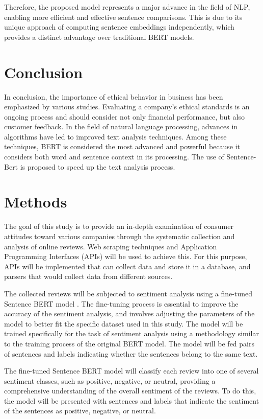 \documentclass[PI]{ProjectProposal}
\begin{document}
Therefore, the proposed model represents a major advance in the field of NLP, enabling more efficient and effective sentence comparisons. This is due to its unique approach of computing sentence embeddings independently, which provides a distinct advantage over traditional BERT models.
\section{Conclusion}
\label{sec:orgdadd73e}
In conclusion, the importance of ethical behavior in business has been emphasized by various studies. Evaluating a company's ethical standards is an ongoing process and should consider not only financial performance, but also customer feedback. In the field of natural language processing, advances in algorithms have led to improved text analysis techniques. Among these techniques, BERT is considered the most advanced and powerful because it considers both word and sentence context in its processing. The use of Sentence-Bert is proposed to speed up the text analysis process.
\section{Methods}
\label{sec:org3da7be6}
The goal of this study is to provide an in-depth examination of consumer attitudes toward various companies through the systematic collection and analysis of online reviews. Web scraping techniques and Application Programming Interfaces (APIs) will be used to achieve this. For this purpose, APIs will be implemented that can collect data and store it in a database, and parsers that would collect data from different sources.

The collected reviews will be subjected to sentiment analysis using a fine-tuned Sentence BERT model \autocite{reimers-2019-sentence-bert}. The fine-tuning process is essential to improve the accuracy of the sentiment analysis, and involves adjusting the parameters of the model to better fit the specific dataset used in this study. The model will be trained specifically for the task of sentiment analysis using a methodology similar to the training process of the original BERT model. The model will be fed pairs of sentences and labels indicating whether the sentences belong to the same text.

The fine-tuned Sentence BERT model will classify each review into one of several sentiment classes, such as positive, negative, or neutral, providing a comprehensive understanding of the overall sentiment of the reviews. To do this, the model will be presented with sentences and labels that indicate the sentiment of the sentences as positive, negative, or neutral.
\end{document}
